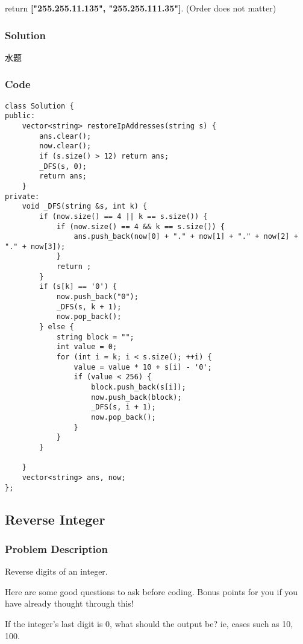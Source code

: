 \documentclass[courier]{article}
\begin{document}
\begin{CJK*}{UTF8}{gkai}
return \textbf{["255.255.11.135", "255.255.111.35"]}. (Order does not matter)



\subsubsection*{Solution}
水题

\subsubsection*{Code}
\begin{lstlisting}
class Solution {
public:
    vector<string> restoreIpAddresses(string s) {
        ans.clear();
        now.clear();
        if (s.size() > 12) return ans;
        _DFS(s, 0);
        return ans;
    }
private:
    void _DFS(string &s, int k) {
        if (now.size() == 4 || k == s.size()) {
            if (now.size() == 4 && k == s.size()) {
                ans.push_back(now[0] + "." + now[1] + "." + now[2] + "." + now[3]);
            }
            return ;
        }
        if (s[k] == '0') {
            now.push_back("0");
            _DFS(s, k + 1);
            now.pop_back();
        } else {
            string block = "";
            int value = 0;
            for (int i = k; i < s.size(); ++i) {
                value = value * 10 + s[i] - '0';
                if (value < 256) {
                    block.push_back(s[i]);
                    now.push_back(block);
                    _DFS(s, i + 1);
                    now.pop_back();
                }
            }
        }
        
    }
    vector<string> ans, now;
}; 
\end{lstlisting}


\subsection{ Reverse Integer }

\subsubsection*{Problem Description}
Reverse digits of an integer.

Here are some good questions to ask before coding. Bonus points for you if you have already thought through this!

If the integer's last digit is 0, what should the output be? ie, cases such as 10, 100.


\end{CJK*}
\end{document}
